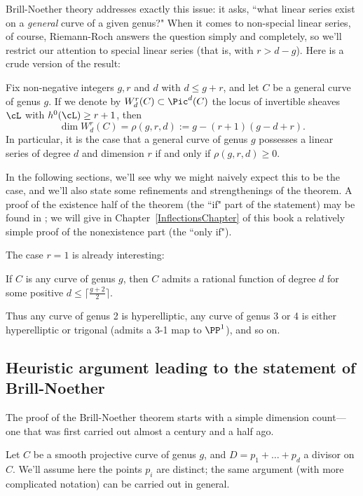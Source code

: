 Brill-Noether theory addresses exactly this issue: it asks, ``what linear series exist on a \emph{general} curve of a given genus?" When it comes to non-special linear series, of course, Riemann-Roch answers the question simply and completely, so we'll restrict our attention to special linear series (that is, with $r > d - g$). 
Here is a crude version of the result:

\begin{theorem}\label{basic BN}
Fix non-negative integers $g, r$ and $d$ with $d \leq g+r$, and let $C$ be a general curve of genus $g$. If we denote by $W^r_d(C) \subset \Pic^d(C)$ the locus of invertible sheaves $\cL$ with $h^0(\cL) \geq r+1$, then
$$
\dim W^r_d(C) = \rho(g,r,d) := g - (r+1)(g-d+r).
$$
In particular, it is the case that a general curve of genus $g$ possesses a linear series of degree $d$ and dimension $r$ if and only if $\rho(g,r,d) \geq 0$.
\end{theorem}

In the following sections, we'll see why we might naively expect this to be the case, and we'll also state some refinements and strengthenings of the theorem.  A proof of the existence half of the theorem (the ``if" part of the statement) may be found in \cite[Theorem ****]{3264};  we will give in Chapter~\ref{InflectionsChapter} of this book a relatively simple proof of the nonexistence part (the ``only if"). 

The case $r=1$ is already interesting:

\begin{corollary}
If $C$ is any curve of genus $g$, then $C$ admits a rational function of degree $d$ for some positive $d \leq \lceil \frac{g+2}{2}\rceil$.
\end{corollary}

Thus any curve of genus 2 is hyperelliptic, any curve of genus 3 or 4 is either hyperelliptic or trigonal  (admits a 3-1 map to $\PP^1$), and so on.


\subsection{Heuristic argument leading to the statement of Brill-Noether}

The proof of the Brill-Noether theorem starts with a simple dimension count---one that was first carried out almost a century and a half ago. 

Let $C$ be a smooth projective curve of genus $g$, and $D = p_1 + \dots + p_d$ a divisor on $C$. We'll assume here the points $p_i$ are distinct; the same argument (with  more complicated notation) can be carried out in general.

